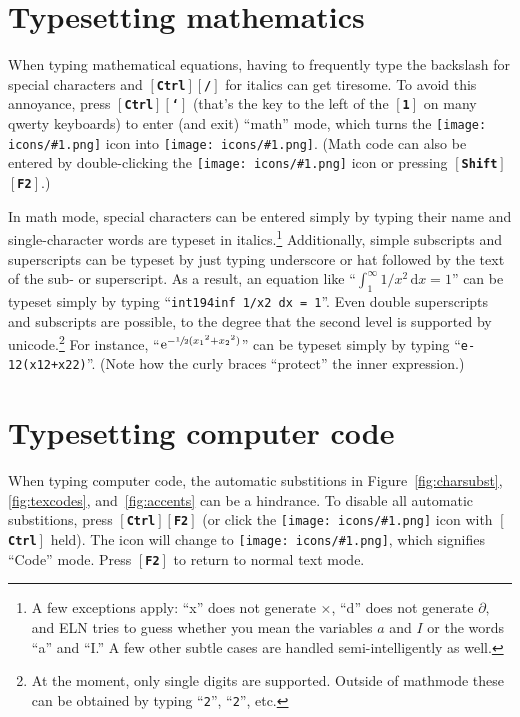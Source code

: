 \documentclass[11pt]{report}
\def\keystroke#1{$\left[\right.\!${\tt\bfseries #1}$\!\left.\right]$}
\def\key#1{\keystroke{#1}}
\def\keycombo#1#2{\keystroke{#1}\keystroke{#2}}
\def\keycontrol#1{\keycombo{Ctrl}{#1}}
\def\keyshift#1{\keycombo{Shift}{#1}}
\def\icon#1{\raise-2pt\hbox{\texttt{[image: icons/\#1.png]}}}
\begin{document}
\section{Typesetting mathematics}

When typing mathematical equations, having to frequently type the backslash for special characters and \keycontrol{/} for
italics can get tiresome. To avoid this annoyance, press
\keycontrol{`} (that's the key to the left of the \key{1} on many
qwerty keyboards) to enter (and exit) ``math'' mode, which turns the
\icon{type} icon into \icon{type-math}. (Math code can
also be entered by double-clicking the \icon{type} icon
or pressing \keyshift{F2}.)

In math mode, special characters can be entered simply by typing their
name and single-character words are typeset in italics.\footnote{A few
  exceptions apply: ``x'' does not generate $\times$, ``d'' does not
  generate $\partial,$ and ELN tries to guess whether you mean the
  variables $a$ and $I$ or the words ``a'' and ``I.'' A few other
  subtle cases are handled semi-intelligently as well.} Additionally,
simple subscripts and superscripts can be typeset by just typing
underscore or hat followed by the text of the sub- or superscript. As
a result, an equation like ``$\int_1^\infty 1/x^2\, \mathrm{d}x =
1$'' can be typeset simply by typing ``{\tt{int1\char94inf
    1/x2 dx = 1}}''. Even double superscripts and subscripts are possible,
to the degree that the second level is supported by
unicode.\footnote{At the moment, only single digits are
  supported. Outside of mathmode these can be obtained by typing
  ``{\tt {}2}'', ``{\tt {}2}'', etc.} For
instance, ``$\mathrm{e}^{-\sfrac12(x_1{}^2+x_2{}^2)}$'' can be typeset simply by
typing
``{\tt{e-12(x12+x22)}}''. (Note
how the curly braces ``protect'' the inner expression.)

\section{Typesetting computer code}\label{sec:codemode}

When typing computer code, the automatic substitions in
Figure~\ref{fig:charsubst}, \ref{fig:texcodes}, and~\ref{fig:accents} can be a
hindrance. To disable all automatic substitions, press \keycontrol{F2}
(or click the \icon{type} icon with \key{Ctrl} held). The icon will
change to \icon{type-code}, which signifies ``Code'' mode. Press
\key{F2} to return to normal text mode.
\end{document}
